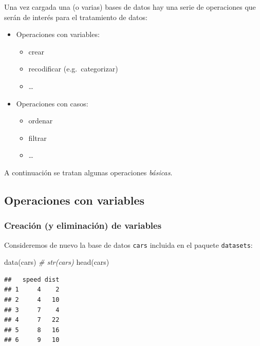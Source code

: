 \documentclass[
]{book}
\newenvironment{Shaded}{\begin{snugshade}}{\end{snugshade}}
\newcommand{\CommentTok}[1]{\textcolor[rgb]{0.56,0.35,0.01}{\textit{#1}}}
\newcommand{\FunctionTok}[1]{\textcolor[rgb]{0.00,0.00,0.00}{#1}}
\newcommand{\NormalTok}[1]{#1}
\providecommand{\tightlist}{%
  \setlength{\itemsep}{0pt}\setlength{\parskip}{0pt}}
\theoremstyle{break}
\theoremstyle{nonumberplain}
\begin{document}
Una vez cargada una (o varias) bases de datos hay una serie de operaciones que serán de interés para el tratamiento de datos:

\begin{itemize}
\tightlist
\item
  Operaciones con variables:

  \begin{itemize}
  \tightlist
  \item
    crear
  \item
    recodificar (e.g.~categorizar)
  \item
    \ldots{}
  \end{itemize}
\item
  Operaciones con casos:

  \begin{itemize}
  \tightlist
  \item
    ordenar
  \item
    filtrar
  \item
    \ldots{}
  \end{itemize}
\end{itemize}

A continuación se tratan algunas operaciones \emph{básicas}.

\hypertarget{op-var}{%
\subsection{Operaciones con variables}\label{op-var}}

\hypertarget{creaciuxf3n-y-eliminaciuxf3n-de-variables}{%
\subsubsection{Creación (y eliminación) de variables}\label{creaciuxf3n-y-eliminaciuxf3n-de-variables}}

Consideremos de nuevo la
base de datos \texttt{cars} incluida en el paquete \texttt{datasets}:

\begin{Shaded}
\begin{Highlighting}[]
\FunctionTok{data}\NormalTok{(cars)}
\CommentTok{\# str(cars)}
\FunctionTok{head}\NormalTok{(cars)}
\end{Highlighting}
\end{Shaded}

\begin{verbatim}
##   speed dist
## 1     4    2
## 2     4   10
## 3     7    4
## 4     7   22
## 5     8   16
## 6     9   10
\end{verbatim}
\end{document}
